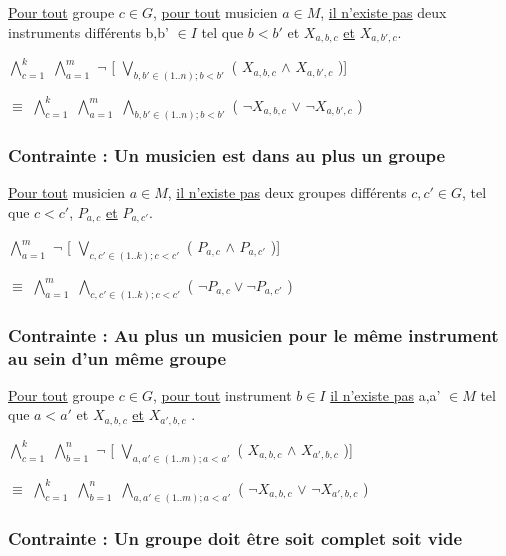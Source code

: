 \documentclass[a4paper,10pt]{article}
\begin{document}
\underline{Pour tout} groupe $c \in G$, \underline{pour tout} musicien $a \in M $, \underline{il n'existe pas} deux instruments différents b,b' $\in I$  tel que $b < b'$ et $X_{a,b,c}$
\underline{et} $X_{a,b',c}$.


$\bigwedge \limits_{c=1}^{k}$ $\bigwedge \limits_{a=1}^{m}$ $\neg$ [ $\bigvee \limits_{b,b' \in (1..n); b < b'}$ ( $X_{a,b,c}$ $\wedge$ $X_{a,b',c}$ )]


$\equiv$ $\bigwedge \limits_{c=1}^{k}$ $\bigwedge \limits_{a=1}^{m}$  $\bigwedge \limits_{b,b' \in (1..n); b < b'}$ ( $\neg X_{a,b,c}$ $\vee $ $ \neg X_{a,b',c}$ )


\subsubsection{Contrainte : Un musicien est dans au plus un groupe}

\underline{Pour tout} musicien $a \in M $, \underline{il n'existe pas} deux groupes différents $c,c' \in G$, tel que $c < c'$, $P_{a,c}$ \underline{et} $P_{a,c'}$.

 $\bigwedge \limits_{a=1}^{m}$ $ \neg$ [ $\bigvee \limits_{c,c' \in (1..k); c < c'}$ ( $P_{a,c}$ $\wedge$ $P_{a,c'}$ )]
 
$\equiv$ $\bigwedge \limits_{a=1}^{m}$ $\bigwedge \limits_{c,c' \in (1..k); c < c'}$  ( $\neg P_{a,c} \vee \neg P_{a,c'} $ )


\subsubsection{Contrainte : Au plus un musicien pour le même instrument au sein d'un même groupe}
 
\underline{Pour tout} groupe $c \in G$, \underline{pour tout} instrument $b \in I$ \underline{il n'existe pas} a,a' $\in M$  tel que $a < a'$ et $X_{a,b,c}$
\underline{et} $X_{a',b,c}$ . 
 
$\bigwedge \limits_{c=1}^{k}$ $\bigwedge \limits_{b=1}^{n}$ $\neg$ [ $\bigvee \limits_{a,a' \in (1..m); a < a'}$ ( $X_{a,b,c}$ $\wedge$ $X_{a',b,c}$ )]


$\equiv$ $\bigwedge \limits_{c=1}^{k}$ $\bigwedge \limits_{b=1}^{n}$  $\bigwedge \limits_{a,a' \in (1..m); a < a'}$ ( $\neg X_{a,b,c}$ $\vee $ $ \neg X_{a',b,c}$ ) 
 
 
\subsubsection{Contrainte : Un groupe doit être soit complet soit vide} 
 
\end{document}

